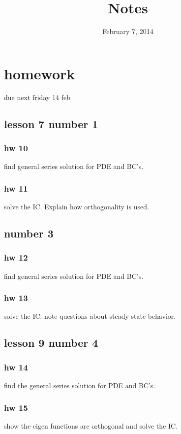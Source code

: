 \documentclass{article}
\begin{document}
\title{Notes}
\date{February 7, 2014}
\maketitle
\section*{homework}
due next friday 14 feb
\subsection*{lesson 7 number 1}
\subsubsection*{hw 10}
find general series solution for PDE and BC's.
\subsubsection*{hw 11}
solve the IC. Explain how orthogonality is used.
\subsection*{number 3}
\subsubsection*{hw 12}
find general series solution for PDE and BC's.
\subsubsection*{hw 13}
solve the IC. note questions about steady-state behavior.
\subsection*{lesson 9 number 4}
\subsubsection*{hw 14}
find the general series solution for PDE and BC's.
\subsubsection*{hw 15}
show the eigen functions are orthogonal and solve the IC.
\end{document}
